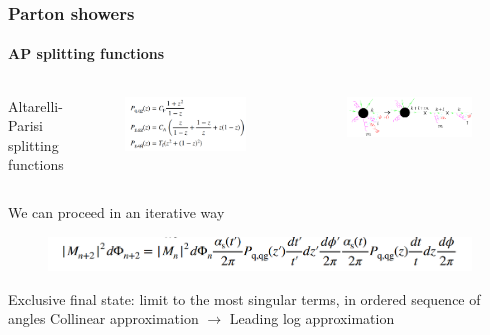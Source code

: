 \documentclass[aspectratio=43]{beamer}
\begin{document}
\begin{frame}

	\frametitle{Parton showers}
	\framesubtitle{AP splitting functions}
	
	\begin{columns}
	
			 
		\footnotesize Altarelli-Parisi splitting functions	
		\begin{figure}
			\includegraphics[width = 5 cm]{plots/AP_splitting.png}
		\end{figure}
		
		
		\begin{figure}
			\includegraphics[width = 6.5 cm]{plots/AP_iteration_plot.png}
		\end{figure}

	\end{columns}

	\vspace{0.4cm}
	
	\footnotesize We can proceed in an iterative way	
	\begin{figure}
		\includegraphics[width = 9 cm]{plots/AP_iteration_eq.png}
	\end{figure}

	\footnotesize Exclusive final state: limit to the most singular terms, in ordered sequence of angles
	\color{red} Collinear approximation $\longrightarrow$ Leading log approximation
	
\end{frame}
\end{document}
